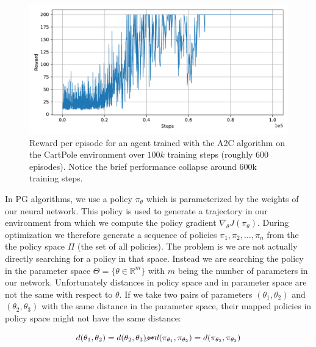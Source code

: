 \begin{figure}[ht]
  
  \begin{center}
      \includegraphics[clip, width=0.8\columnwidth]{figures/rl/a2c_cart_pole_plot.pdf}
  \end{center}
  
  \caption[Learning Curve for A2C on CartPole]{Reward per episode for an agent trained with the A2C algorithm on the CartPole environment over $100k$ training steps (roughly 600 episodes). Notice the brief performance collapse around 600k training steps.}
  \label{fig:a2c_cartpole}
\end{figure}

In PG algorithms, we use a policy $\pi_\theta$ which is parameterized by the weights of our neural network. This policy is used to generate a trajectory in our environment from which we compute the policy gradient $\nabla_\theta J(\pi_\theta)$. During optimization we therefore generate a sequence of policies $\pi_1, \pi_2, \dots, \pi_n$ from the the policy space $\Pi$ (the set of all policies). The problem is we are not actually directly searching for a policy in that space. Instead we are searching the policy in the parameter space $\Theta = \{\theta \in \mathbb{R}^m\}$ with $m$ being the number of parameters in our network. Unfortunately distances in policy space and in parameter space are not the same with respect to $\theta$. If we take two pairs of parameters $(\theta_1, \theta_2)$ and $(\theta_2, \theta_3)$ with the same distance in the parameter space, their mapped policies in policy space might not have the same distance:

\[d(\theta_1, \theta_2) = d(\theta_2, \theta_3) \cancel{\Leftrightarrow} d(\pi_{\theta_1}, \pi_{\theta_2}) = d(\pi_{\theta_2}, \pi_{\theta_3}) \]

